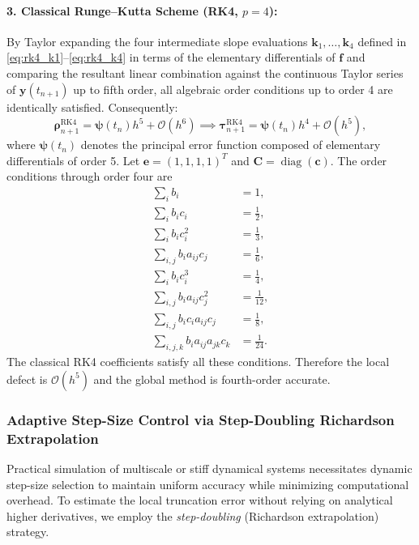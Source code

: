 \documentclass[11pt,a4paper]{article}
\theoremstyle{definition}
\theoremstyle{remark}
\begin{document}
\paragraph{3. Classical Runge--Kutta Scheme (RK4, $p=4$):}
By Taylor expanding the four intermediate slope evaluations $\mathbf{k}_1, \dots, \mathbf{k}_4$ defined in \eqref{eq:rk4_k1}--\eqref{eq:rk4_k4} in terms of the elementary differentials of $\mathbf{f}$ and comparing the resultant linear combination against the continuous Taylor series of $\mathbf{y}(t_{n+1})$ up to fifth order, all algebraic order conditions up to order 4 are identically satisfied. Consequently:
\begin{equation}
\label{eq:rk4_defect}
\boldsymbol{\rho}_{n+1}^{\text{RK4}} = \boldsymbol{\psi}(t_n) h^5 + \mathcal{O}(h^6) \implies \boldsymbol{\tau}_{n+1}^{\text{RK4}} = \boldsymbol{\psi}(t_n) h^4 + \mathcal{O}(h^5),
\end{equation}
where $\boldsymbol{\psi}(t_n)$ denotes the principal error function composed of elementary differentials of order 5. Let $\mathbf{e}=(1,1,1,1)^T$ and $\mathbf{C}=\operatorname{diag}(\mathbf{c})$. The order conditions through order four are
\begin{align}
\sum_i b_i &= 1, \\
\sum_i b_i c_i &= \frac12, \\
\sum_i b_i c_i^2 &= \frac13, \\
\sum_{i,j} b_i a_{ij}c_j &= \frac16, \\
\sum_i b_i c_i^3 &= \frac14, \\
\sum_{i,j} b_i a_{ij}c_j^2 &= \frac1{12}, \\
\sum_{i,j} b_i c_i a_{ij}c_j &= \frac18, \\
\sum_{i,j,k} b_i a_{ij}a_{jk}c_k &= \frac1{24}.
\end{align}
The classical RK4 coefficients satisfy all these conditions. Therefore the local defect is $\mathcal{O}(h^5)$ and the global method is fourth-order accurate.

\subsubsection{Adaptive Step-Size Control via Step-Doubling Richardson Extrapolation}
Practical simulation of multiscale or stiff dynamical systems necessitates dynamic step-size selection to maintain uniform accuracy while minimizing computational overhead. To estimate the local truncation error without relying on analytical higher derivatives, we employ the \emph{step-doubling} (Richardson extrapolation) strategy.
\end{document}
